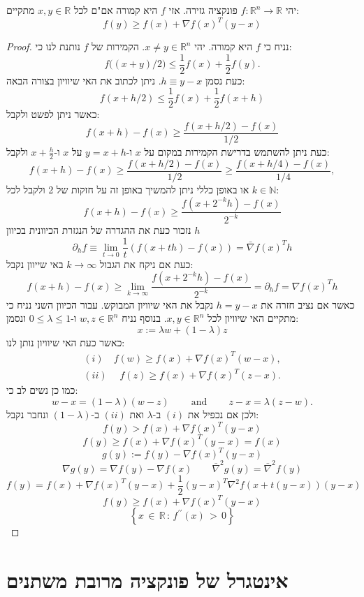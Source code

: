 \documentclass{tstextbook}
\begin{document}
\begin{proposition}
יהי \(f:\mathbb{R}^{n}\to \mathbb{R}\) פונקציה גזירה. אזי \(f\) היא קמורה אם"ם לכל \(x,y \in \mathbb{R}\) מתקיים:
$$f(y)\geq f(x)+\nabla f(x)^{T}(y-x)$$

\end{proposition}
\begin{proof}
נניח כי \(f\) היא קמורה. יהי \(x\neq y \in \mathbb{R}^{n}\). הקמירות של \(f\) נותנת לנו כי:
$$f{\big(}(x+y)/2{\big)}\leq{\frac{1}{2}}f(x)+{\frac{1}{2}}f(y).$$
כעת נסמן \(h\equiv y-x\). ניתן לכתוב את האי שיוויון בצורה הבאה:
$$f(x+h/2)\leq{\frac{1}{2}}f(x)+{\frac{1}{2}}f(x+h)$$
כאשר ניתן לפשט ולקבל:
$$f(x+h)-f(x)\geq{\frac{f(x+h/2)-f(x)}{1/2}}$$
כעת ניתן להשתמש בדרישת הקמירות במקום על \(x\) ו-\(y=x+h\) על \(x\) ו-\(x+\frac{h}{2}\) ולקבל:
$$f(x+h)-f(x)\geq{\frac{f(x+h/2)-f(x)}{1/2}}\geq{\frac{f(x+h/4)-f(x)}{1/4}},$$
או באופן כללי ניתן להמשיך באופן זה על חזקות של 2 ולקבל לכל \(k \in \mathbb{N}\):
$$f(x+h)-f(x)\geq{\frac{f(x+2^{-k}h)-f(x)}{2^{-k}}}$$
נזכור כעת את ההגדרה של הנגזרת הכיוונית בכיוון \(h\)$$\partial_{h} f\equiv \lim_{ t \to 0 } \frac{1}{t}(f(x+th)-f(x)) = \bar{\nabla} f(x)^{T}h$$
כעת אם ניקח את הגבול \(k\to \infty\) באי שייוון נקבל:
$$f(x+h)-f(x)\geq\operatorname*{lim}_{k\to\infty}{\frac{f(x+2^{-k}h)-f(x)}{2^{-k}}}=\partial_{h}f=\nabla f(x)^{T}h$$
כאשר אם נציב חזרה את \(h=y-x\) נקבל את האי שיוויון המבוקש. 
עבור הכיוון השני נניח כי מתקיים האי שיוויון לכל \(x, y \in \mathbb{R}^{n}\). בנוסף נניח \(w,z \in \mathbb{R}^{n}\) ו-\(0\leq \lambda \leq 1\) ונסמן:
$$x:= \lambda w+\left( 1-\lambda \right) z$$
כאשר כעת האי שיוויון נותן לנו:
$$\begin{array}{c}{(i)\quad {f(w)\geq f(x)+\nabla f(x)^{T}(w-x),}}\\ (ii)\quad \;{{f(z)\geq f(x)+\nabla f(x)^{T}(z-x).}}\end{array}$$
כמו כן נשים לב כי:
$$w-x=(1-\lambda)(w-z)\qquad{\mathrm{~and~}}\qquad z-x=\lambda(z-w).$$
ולכן אם נכפיל את \((i)\) ב-\(\lambda\) ואת \((ii)\) ב-\(\left( 1-\lambda \right)\) ונחבר נקבל:
$$f(y)>f(x)+\nabla f(x)^{T}(y-x)$$$$f(y)\geq f(x)+\nabla f(x)^{T}(y-x)=f(x)$$$$g(y):=f(y)-\nabla f(x)^{T}(y-x)$$$$\nabla g(y)=\nabla f(y)-\nabla f(x) \qquad \bar{\nabla}^2 g(y)=\bar{\nabla}^2 f(y)$$$$f(y)=f(x)+\nabla f(x)^{T}(y-x)+{\frac{1}{2}}(y-x)^{T}\nabla^{2}f(x+t(y-x))(y-x)$$$$f(y)\geq f(x)+\nabla f(x)^{T}(y-x)$$$$\left\{x\,\in\,\mathbb{R}\,:\,f^{\prime\prime}(x)\,>\,0\right\}$$

\end{proof}
\section{אינטגרל של פונקציה מרובת משתנים}
\end{document}
